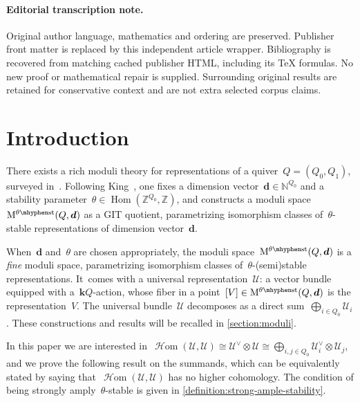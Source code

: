 \documentclass[11pt]{article}
\theoremstyle{plain}
\theoremstyle{definition}
\DeclareMathOperator\Hom{Hom}
\DeclareMathOperator\sheafHom{\mathcal{H}om}
\newcommand\field{\mathbf{k}}
\newcommand\moduli{\ensuremath{\mathrm{M}}}
\newcommand\stable{\ensuremath{\mhyphen\mathrm{st}}}
\newcommand\tuple[1]{\ensuremath{{\boldsymbol{#1}}}}
\begin{document}
\paragraph{Editorial transcription note.}
Original author language, mathematics and ordering are preserved. Publisher front matter is replaced by this independent article wrapper. Bibliography is recovered from matching cached publisher HTML, including its TeX formulas. No new proof or mathematical repair is supplied. Surrounding original results are retained for conservative context and are not extra selected corpus claims.
\clearpage

\section{Introduction}
\label{section:introduction}
There exists a rich moduli theory for representations of a quiver~$Q=(Q_0,Q_1)$,
surveyed in~\cite{MR2484736}.
Following King~\cite{MR1315461},
one fixes a dimension vector~$\tuple{d}\in\mathbb{N}^{Q_0}$
and a stability parameter~$\theta\in\Hom(\mathbb{Z}^{Q_0},\mathbb{Z})$,
and constructs a moduli space~$\moduli^{\theta\stable}(Q,\tuple{d})$ as a GIT quotient,
parametrizing isomorphism classes of~$\theta$-stable representations
of dimension vector~$\tuple{d}$.

When~$\tuple{d}$ and~$\theta$ are chosen appropriately,
the moduli space~$\moduli^{\theta\stable}(Q,\tuple{d})$
is a \emph{fine} moduli space,
parametrizing isomorphism classes of~$\theta$-(semi)stable representations. It~comes with a universal representation~$\mathcal{U}$:
a vector bundle equipped with a~$\field Q$\nobreakdash-action,
whose fiber in a point~$[V]\in\moduli^{\theta\stable}(Q,\tuple{d})$
is the representation~$V$.
The universal bundle~$\mathcal{U}$ decomposes as a direct sum~$\bigoplus_{i\in Q_0}\mathcal{U}_i$.
These constructions and results will be recalled in \cref{section:moduli}.

In this paper
we are interested in~$\sheafHom(\mathcal{U},\mathcal{U})\cong\mathcal{U}^\vee\otimes\mathcal{U}\cong\bigoplus_{i,j\in Q_0}\mathcal{U}_i^\vee\otimes\mathcal{U}_j$,
and we prove the following result on the summands,
which can be equivalently stated by saying that~$\sheafHom(\mathcal{U},\mathcal{U})$
has no higher cohomology.
The condition of being strongly amply~$\theta$-stable
is given in \cref{definition:strong-ample-stability}.
\end{document}
